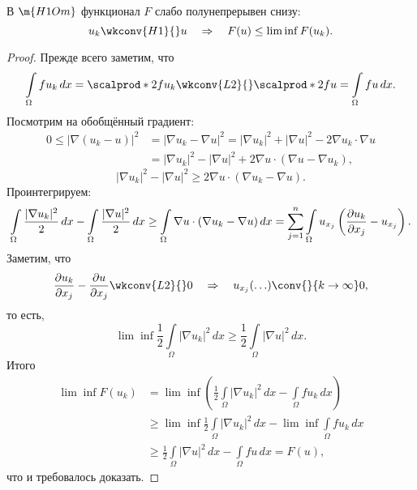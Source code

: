 \begin{note} В $\m{H1Om}$ функционал $F$ слабо полунепрерывен снизу:
$$u_k \wkconv{H1}{} u \quad \Rightarrow \quad F(u) \leq \lim \inf F(u_k).$$
\end{note}
\begin{proof} Прежде всего заметим, что
$$ \int \limits_\Omega f u_k \, dx = \scalprod*{2}{f}{u_k} \wkconv{L2}{} \scalprod*{2}{f}{u} =\int \limits_\Omega f u \, dx.$$
Посмотрим на обобщённый градиент:
\begin{align*}
0 \leq | \nabla (u_k - u) |^2 &= | \nabla u_k - \nabla u |^2 = |\nabla u_k|^2 + |\nabla u|^2 - 2 \nabla u_k \cdot \nabla u \\
&= |\nabla u_k|^2 - |\nabla u|^2 + 2 \nabla u \cdot (\nabla u - \nabla u_k),
\end{align*}
$$ |\nabla u_k|^2 - |\nabla u|^2 \geq 2 \nabla u \cdot (\nabla u_k - \nabla u).$$
Проинтегрируем:
$$ \int \limits_\Omega \frac {| \nabla u_k|^2} {2} \, dx - \int \limits_\Omega \frac {| \nabla u|^2} {2} \, dx \geq \int \limits_\Omega \nabla u \cdot (\nabla u_k - \nabla u) \, dx = \sum_{j=1}^n \int \limits_\Omega u_{x_j} \left( \pder[u_k]{x_j} - u_{x_j} \right) .$$
Заметим, что
$$ \pder[u_k]{x_j} - \pder[u]{x_j} \wkconv{L2}{} 0 \quad \Rightarrow \quad u_{x_j} (\hdots) \conv{}{k \to \infty} 0,$$
то есть,
$$ \lim \inf \frac {1} {2} \int \limits_\Omega |\nabla u_k|^2 \, dx \geq \frac {1} {2} \int \limits_\Omega |\nabla u|^2 \, dx.$$
Итого
\begin{align*}
\lim \inf F(u_k) &= \lim \inf \left( \frac {1}{2} \int \limits_\Omega |\nabla u_k|^2 \, dx - \int \limits_\Omega fu_k \, dx \right) \\
&\geq \lim \inf \frac {1} {2} \int \limits_\Omega |\nabla u_k|^2 \, dx - \lim \inf \int \limits_\Omega fu_k \, dx \\
&\geq \frac {1} {2} \int \limits_\Omega |\nabla u|^2 \, dx - \int \limits_\Omega fu \, dx = F(u),
\end{align*}
что и требовалось доказать.

\end{proof}

